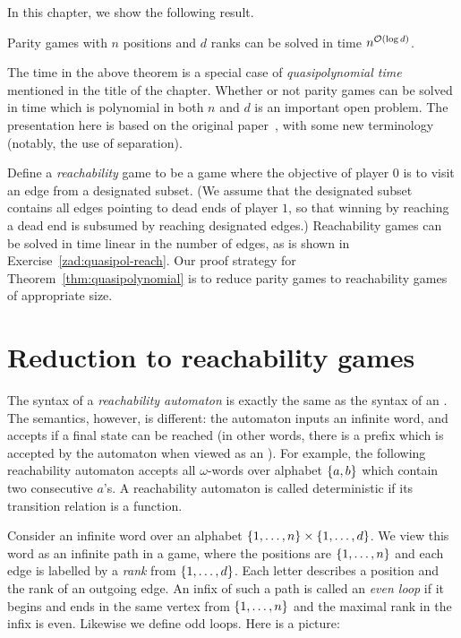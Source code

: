 In this chapter, we show the following result.
\begin{theorem}\label{thm:quasipolynomial}
Parity games with $n$ positions and $d$ ranks can be solved in  time 
$n^{\mathcal{O}(\log d)}$.
\end{theorem}
The time in the above theorem is  a special case of \emph{quasipolynomial time} mentioned in the title of the chapter.  Whether or not parity games can be solved in time  which is polynomial in both $n$ and $d$  is an important open problem.
The presentation here is based on the original paper~\cite{Calude:2017cw}, with some new terminology (notably, the use of separation).


Define a \emph{reachability} game to be a game where the objective  of player $0$  is to  visit an edge from a designated subset. (We  assume that the designated subset contains all edges pointing to dead ends of player $1$, so that winning by reaching a dead end is subsumed by reaching designated edges.)  Reachability games can  be solved in time linear in the number of edges, as is shown in Exercise~\ref{zad:quasipol-reach}.
Our proof strategy for Theorem~\ref{thm:quasipolynomial}  is to reduce  parity games to reachability games of appropriate size.





\section{Reduction to reachability games}
  The syntax of a  \emph{reachability automaton} is exactly the same as the syntax of an \nfa. The semantics, however, is different: the automaton inputs an infinite word, and accepts if a final state can be reached (in other words, there is a prefix which is accepted by the automaton when viewed as an \nfa). For example, the following reachability automaton 
accepts all $\omega$-words over alphabet $\{a,b\}$ which contain two consecutive $a$'s. A reachability automaton is called deterministic if its transition relation is a function.

Consider an infinite word over an alphabet $\{1,\ldots,n\} \times \{1,\ldots,d\}$. We view this word as an infinite path in a game, where the positions are $\{1,\ldots,n\}$ and each edge is labelled by a \emph{rank} from  $\{1,\ldots,d\}$. Each letter describes a position and the rank of an outgoing edge. An infix of such a path is called an \emph{even loop} if it begins and ends in the same vertex from $\{1,\ldots,n\}$ and the maximal rank in the infix is even. Likewise we define odd loops. Here is a picture:


